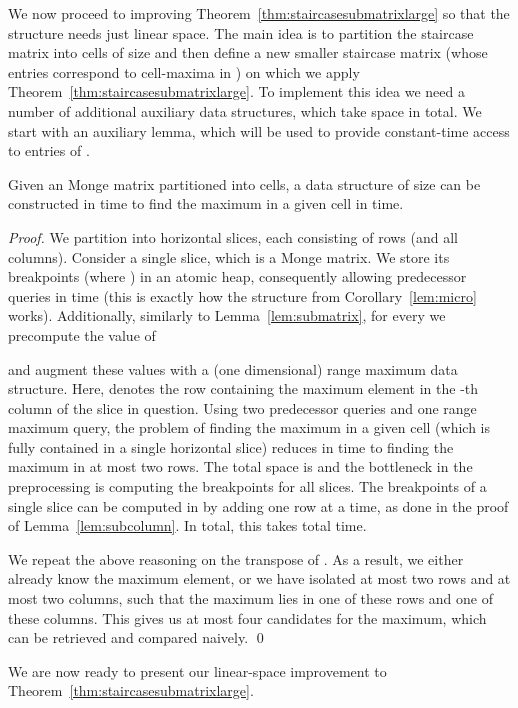 \documentclass{llncs}
\begin{document}
We now proceed to improving Theorem~\ref{thm:staircasesubmatrixlarge} so that the structure needs just linear space. The main idea
is to partition the  staircase matrix  into cells of size  and then define a new smaller 
staircase matrix  (whose entries correspond to cell-maxima in ) on which we apply Theorem~\ref{thm:staircasesubmatrixlarge}. To implement this idea
we need a number of additional auxiliary data structures, which take  space in total. 
We start with an auxiliary lemma, which will be used to provide constant-time access to entries of . 

\begin{lemma}
\label{lem:cellmaximum}
Given an  Monge matrix  partitioned into  cells, a data structure
of size  can be constructed in  time to find the maximum in a given cell in  time.
\end{lemma}

\begin{proof}
We partition  into  horizontal slices, each consisting of  rows (and all columns). Consider a single slice,
which is a  Monge matrix.
We store its breakpoints  (where ) in an atomic heap,
consequently allowing predecessor queries in  time (this is exactly how the structure from
Corollary~\ref{lem:micro} works). Additionally, similarly to Lemma~\ref{lem:submatrix}, for every 
we precompute the value of

and augment these values with a (one dimensional) range maximum data structure. Here,  denotes the row containing
the maximum element in the -th column of the slice in question. 
Using two predecessor queries
and one range maximum query, the problem of finding the maximum in a given cell
(which is fully contained in a single horizontal slice) reduces in  time to finding the maximum in at most two rows.
The total space is  and the bottleneck
in the preprocessing is computing the breakpoints for all slices.
The breakpoints of a single slice can be computed in  by
adding one row at a time, as done in the proof of
Lemma~\ref{lem:subcolumn}. In total, this  takes  total time. 

We repeat the above reasoning on the transpose of . As a result, we either already know the maximum
element, or we have isolated at most two rows and at most two columns, such that the maximum lies in one of these rows and one of these columns. This gives us at most four candidates
for the maximum, which can be retrieved and compared naively. \qed
\end{proof}

\noindent We are now ready to present our linear-space improvement to  Theorem~\ref{thm:staircasesubmatrixlarge}.
\end{document}
